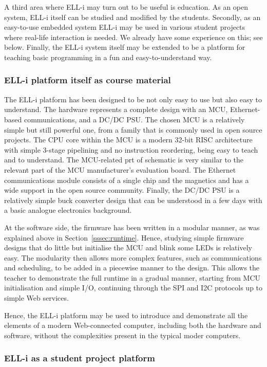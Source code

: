 \documentclass[final]{siamltex}
\begin{document}
A third area where ELL-i may turn out to be useful is education.  As
an open system, ELL-i itself can be studied and modified by the
students.  Secondly, as an easy-to-use embedded system ELL-i may be
used in various student projects where real-life interaction is
needed.  We already have some experience on this; see below.  Finally,
the ELL-i system itself may be extended to be a platform for teaching
basic programming in a fun and easy-to-understand way.

\subsubsection{ELL-i platform itself as course material}

The ELL-i platform has been designed to be not only easy to use but
also easy to understand.  The hardware represents a complete design
with an MCU, Ethernet-based communications, and a DC/DC PSU.  The
chosen MCU is a relatively simple but still powerful one, from a
family that is commonly used in open source projects.  The CPU core
within the MCU is a modern 32-bit RISC architecture with simple
3-stage pipelining and no instruction reordering, being easy to teach
and to understand.  The MCU-related prt of schematic is very similar
to the relevant part of the MCU manufacturer's evaluation board.  The
Ethernet communications module consists of a single chip and the
magnetics and has a wide support in the open source community.
Finally, the DC/DC PSU is a relatively simple buck converter design
that can be understood in a few days with a basic analogue electronics
background.

At the software side, the firmware has been written in a modular
manner, as was explained above in Section~\ref{sssec:runtime}.  Hence,
studying simple firmware designs that do little but initialise the MCU
and blink some LEDs is relatively easy.  The modularity then allows
more complex features, such as communications and scheduling, to be
added in a piecewise manner to the design.  This allows the teacher to
demonstrate the full runtime in a gradual manner, starting from MCU
initialisation and simple I/O, continuing through the SPI and I2C
protocols up to simple Web services.

Hence, the ELL-i platform may be used to introduce and demonstrate all
the elements of a modern Web-connected computer, including both the
hardware and software, without the complexities present in the typical
moder computers.

\subsubsection{ELL-i as a student project platform}
\end{document}

